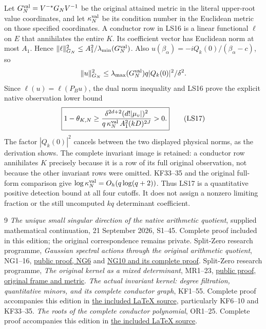 \documentclass[11pt]{article}
\newcommand{\norm}[1]{\lVert#1\rVert}
\begin{document}
Let $G_N^{\rm val}=V^{-*}G_NV^{-1}$ be the original attained
metric in the literal upper-root value coordinates, and let
$\kappa_N^{\rm val}$ be its condition number in the Euclidean
metric on those specified coordinates. A conductor row in LS16
is a linear functional $\ell$ on $E$ that annihilates the entire
$K$. Its coefficient vector has Euclidean norm at most $A_1$.
Hence $\norm\ell_{G_N}^2\le A_1^2/\lambda_{\min}(G_N^{\rm val})$.
Also $u(\beta_\alpha)=-iQ_k(0)/(\beta_\alpha-c)$, so
\[
\norm u_{G_N}^2
\le\lambda_{\max}(G_N^{\rm val})q|Q_k(0)|^2/\delta^2.
\]
Since $\ell(u)=\ell(P_Bu)$, the dual norm inequality and LS16
prove the explicit native observation lower bound
\[
\boxed{1-\theta_{K,N}
\ge
\frac{\delta^{2d+2}(d!|\mu_v|)^2}
 {q\,\kappa_N^{\rm val}\,A_1^2(kD)^{2J}}>0.}
\tag{LS17}
\]
The factor $|Q_k(0)|^2$ cancels between the two displayed
physical norms, as the derivation shows. The complete invariant
image is retained: a conductor row annihilates $K$ precisely
because it is a row of its full original observation, not because
the other invariant rows were omitted.
KF33--35 and the original full-form comparison give
$\log\kappa_N^{\rm val}=O_h(q\log(q+2))$.
Thus LS17 is a quantitative positive detection bound at all
four cutoffs. It does not assign a nonzero limiting fraction
or the still uncomputed $kq$ determinant coefficient.

\begin{thebibliography}{9}
 \emph{The unique small singular direction of the
native arithmetic quotient}, supplied mathematical continuation,
21 September 2026, S1--45. Complete proof included in this edition;
the original correspondence remains private.
 Split-Zero research programme,
\emph{Gaussian spectral actions through the original arithmetic
quotient}, NG1--16,
\href{https://github.com/KokunoYumeto/zeta-function-research-reader/blob/5992ad50c0f2a06921f1fcaded7b4e38097c0739/workbenches/splitzero-tandem/continuations/20260920-original-kernel-mixed-determinants/providers/NATIVE_GAUSSIAN_TRANSFER.tex#L101}{public proof, NG6}
and
\href{https://github.com/KokunoYumeto/zeta-function-research-reader/blob/5992ad50c0f2a06921f1fcaded7b4e38097c0739/workbenches/splitzero-tandem/continuations/20260920-original-kernel-mixed-determinants/providers/NATIVE_GAUSSIAN_TRANSFER.tex#L207}{NG10 and its complete proof}.
 Split-Zero research programme,
\emph{The original kernel as a mixed determinant}, MR1--23,
\href{https://github.com/KokunoYumeto/zeta-function-research-reader/blob/5992ad50c0f2a06921f1fcaded7b4e38097c0739/workbenches/splitzero-tandem/continuations/20260920-original-kernel-mixed-determinants/ORIGINAL_KERNEL_MIXED_DETERMINANT.tex#L36}{public proof, original frame and metric}.
 \emph{The actual invariant kernel: degree filtration,
quantitative minors, and its complete conductor graph}, KF1--55.
Complete proof accompanies this edition in
\href{ACTUAL_KERNEL_FILTRATION_AND_GRAPH.tex}{the included LaTeX source},
particularly KF6--10 and KF33--35.
 \emph{The roots of the complete conductor polynomial},
OR1--25. Complete proof accompanies this edition in
\href{COMPLETE_CONDUCTOR_ROOT_GEOMETRY.tex}{the included LaTeX source}.
\end{thebibliography}
\end{document}
